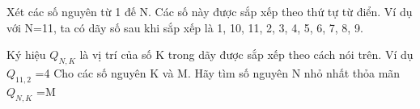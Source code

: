 Xét các số nguyên từ 1 đế N. Các số này được sắp xếp theo thứ tự từ điển. Ví dụ với N=11, ta có dãy số sau khi sắp xếp là 1, 10, 11, 2, 3, 4, 5, 6, 7, 8, 9.

Ký hiệu $Q_{N,K}$ là vị trí của số K trong dãy được sắp xếp theo cách nói trên. Ví dụ $Q_{11,2}$ =4 Cho các số nguyên K và M. Hãy tìm số nguyên N nhỏ nhất thỏa mãn $Q_{N,K}$ =M